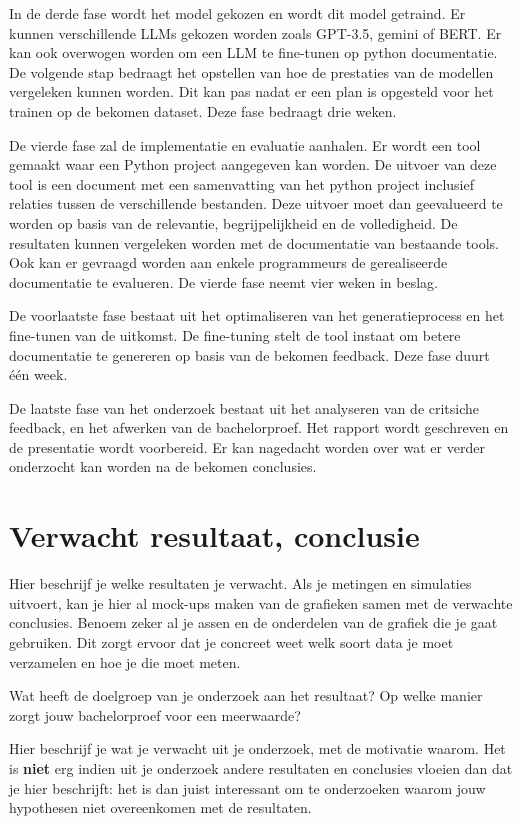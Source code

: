 In de derde fase wordt het model gekozen en wordt dit model getraind. Er kunnen verschillende LLMs gekozen worden zoals GPT-3.5, gemini of BERT.
Er kan ook overwogen worden om een LLM te fine-tunen op python documentatie.
De volgende stap bedraagt het opstellen van hoe de prestaties van de modellen vergeleken kunnen worden. 
Dit kan pas nadat er een plan is opgesteld voor het trainen op de bekomen dataset.
Deze fase bedraagt drie weken.

De vierde fase zal de implementatie en evaluatie aanhalen.
Er wordt een tool gemaakt waar een Python project aangegeven kan worden. 
De uitvoer van deze tool is een document met een samenvatting van het python project inclusief relaties tussen de verschillende bestanden.
Deze uitvoer moet dan geevalueerd te worden op basis van de relevantie, begrijpelijkheid en de volledigheid. 
De resultaten kunnen vergeleken worden met de documentatie van bestaande tools.
Ook kan er gevraagd worden aan enkele programmeurs de gerealiseerde documentatie te evalueren.
De vierde fase neemt vier weken in beslag.

De voorlaatste fase bestaat uit het optimaliseren van het generatieprocess en het fine-tunen van de uitkomst.
De fine-tuning stelt de tool instaat om betere documentatie te genereren op basis van de bekomen feedback.
Deze fase duurt één week.

De laatste fase van het onderzoek bestaat uit het analyseren van de critsiche feedback, en het afwerken van de bachelorproef.
Het rapport wordt geschreven en de presentatie wordt voorbereid. 
Er kan nagedacht worden over wat er verder onderzocht kan worden na de bekomen conclusies.

\section{Verwacht resultaat, conclusie}%
\label{sec:verwachte_resultaten}

Hier beschrijf je welke resultaten je verwacht. Als je metingen en simulaties uitvoert, kan je hier al mock-ups maken van de grafieken samen met de verwachte conclusies. 
Benoem zeker al je assen en de onderdelen van de grafiek die je gaat gebruiken. 
Dit zorgt ervoor dat je concreet weet welk soort data je moet verzamelen en hoe je die moet meten.

Wat heeft de doelgroep van je onderzoek aan het resultaat? Op welke manier zorgt jouw bachelorproef voor een meerwaarde?

Hier beschrijf je wat je verwacht uit je onderzoek, met de motivatie waarom. Het is \textbf{niet} erg indien uit je onderzoek andere 
resultaten en conclusies vloeien dan dat je hier beschrijft: het is dan juist interessant om te 
onderzoeken waarom jouw hypothesen niet overeenkomen met de resultaten.

